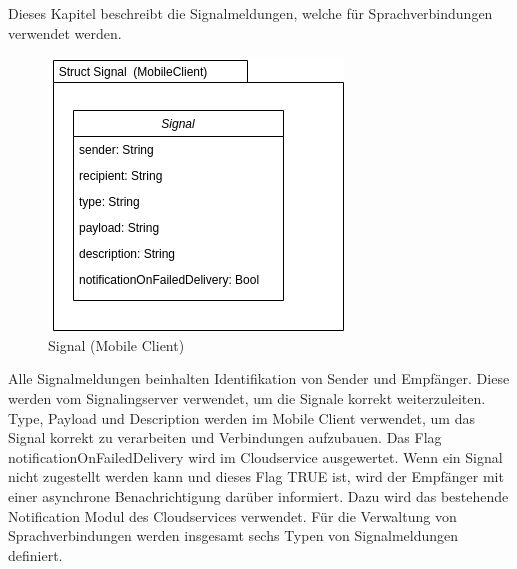 Dieses Kapitel beschreibt die Signalmeldungen, welche für Sprachverbindungen verwendet werden.

\begin{figure}[h]
    \centering
    \begin{minipage}[b]{0.4\textwidth}
        \includegraphics[width=\textwidth]{graphics/diagramms/Class_Signal_V01}
        \caption{Signal (Mobile Client)}
    \end{minipage}
\end{figure}

Alle Signalmeldungen beinhalten Identifikation von Sender und Empfänger.
Diese werden vom Signalingserver verwendet, um die Signale korrekt weiterzuleiten.
Type, Payload und Description werden im Mobile Client verwendet, um das Signal korrekt zu verarbeiten und Verbindungen aufzubauen.
Das Flag notificationOnFailedDelivery wird im Cloudservice ausgewertet.
Wenn ein Signal nicht zugestellt werden kann und dieses Flag TRUE ist, wird der Empfänger mit einer asynchrone Benachrichtigung darüber informiert.
Dazu wird das bestehende Notification Modul des Cloudservices verwendet.
Für die Verwaltung von Sprachverbindungen werden insgesamt sechs Typen von Signalmeldungen definiert.


\clearpage


